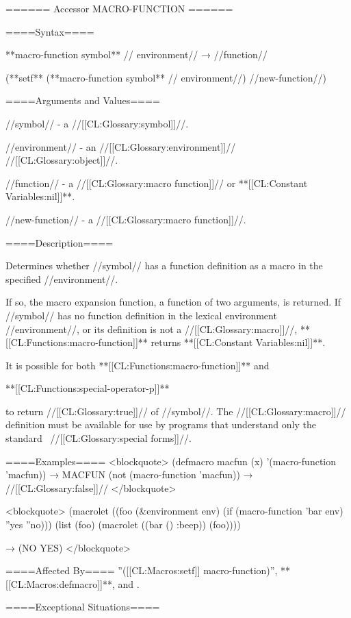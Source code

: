 ====== Accessor MACRO-FUNCTION ======

====Syntax====

**macro-function {symbol** //\opt} environment// → //function//

(**setf** (**macro-function {symbol** //\opt} environment//) //new-function//)

====Arguments and Values====

//symbol// - a //[[CL:Glossary:symbol]]//.


//environment// - an //[[CL:Glossary:environment]]// //[[CL:Glossary:object]]//.

//function// - a //[[CL:Glossary:macro function]]// or **[[CL:Constant Variables:nil]]**.

//new-function// - a //[[CL:Glossary:macro function]]//.

====Description====

Determines whether //symbol// has a function definition as a macro in the specified //environment//.

If so, the macro expansion function, a function of two arguments, is returned. If //symbol// has no function definition in the lexical environment //environment//, or its definition is not a //[[CL:Glossary:macro]]//, **[[CL:Functions:macro-function]]** returns **[[CL:Constant Variables:nil]]**.






It is possible for both **[[CL:Functions:macro-function]]** and

**[[CL:Functions:special-operator-p]]**

to return //[[CL:Glossary:true]]// of //symbol//. The //[[CL:Glossary:macro]]// definition must be available for use by programs that understand only the standard \clisp\ //[[CL:Glossary:special forms]]//.

====Examples==== <blockquote> (defmacro macfun (x) '(macro-function 'macfun)) → MACFUN (not (macro-function 'macfun)) → //[[CL:Glossary:false]]// </blockquote>

<blockquote> (macrolet ((foo (&environment env) (if (macro-function 'bar env) ''yes ''no))) (list (foo) (macrolet ((bar () :beep)) (foo))))

→ (NO YES) </blockquote>


====Affected By==== ''([[CL:Macros:setf]] macro-function)'', **[[CL:Macros:defmacro]]**, and .

====Exceptional Situations====

